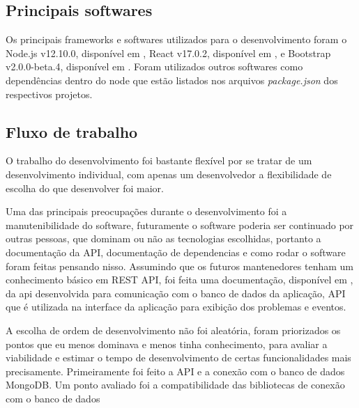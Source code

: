 \subsection{Principais softwares}

Os principais frameworks e softwares utilizados para o desenvolvimento foram o Node.js v12.10.0, disponível em \cite{nodejs},  React v17.0.2, disponível em \cite{react}, e Bootstrap v2.0.0-beta.4, disponível em \cite{reactbootstrap}. Foram utilizados outros softwares como dependências dentro do node que estão listados nos arquivos \textit{package.json} dos respectivos projetos.

\subsection{Fluxo de trabalho}

O trabalho do desenvolvimento foi bastante flexível por se tratar de um desenvolvimento individual, com apenas um desenvolvedor a flexibilidade de escolha do que desenvolver foi maior.

Uma das principais preocupações durante o desenvolvimento foi a manutenibilidade do software, futuramente o software poderia ser continuado por outras pessoas, que dominam ou não as tecnologias escolhidas, portanto a documentação da API, documentação de dependencias e como rodar o software foram feitas pensando nisso. Assumindo que os futuros mantenedores tenham um conhecimento básico em REST API, foi feita uma documentação, disponível em \cite{doc:gamajudgeapi}, da api desenvolvida para comunicação com o banco de dados da aplicação, API que é utilizada na interface da aplicação para exibição dos problemas e eventos. 

A escolha de ordem de desenvolvimento não foi aleatória, foram priorizados os pontos que eu menos dominava e menos tinha conhecimento, para avaliar a viabilidade e estimar o tempo de desenvolvimento de certas funcionalidades mais precisamente. Primeiramente foi feito a API e a conexão com o banco de dados MongoDB. Um ponto avaliado foi a compatibilidade das bibliotecas de conexão com o banco de dados 